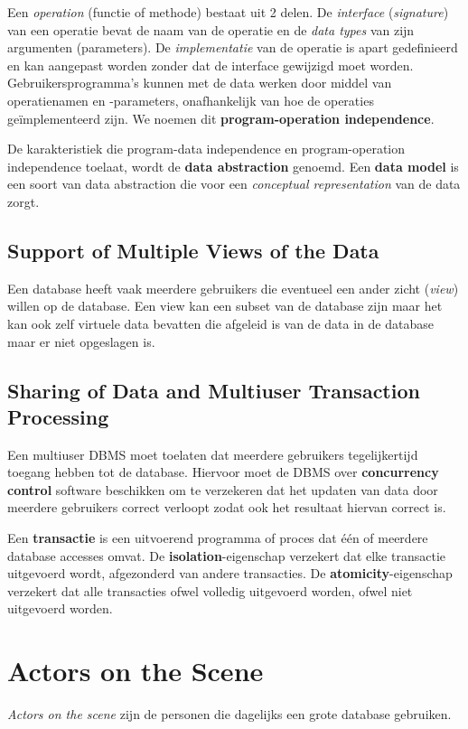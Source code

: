 Een \textit{operation} (functie of methode) bestaat uit 2 delen. De \textit{interface} (\textit{signature}) van een operatie bevat de naam van de operatie en de \textit{data types} van zijn argumenten (parameters). De \textit{implementatie} van de operatie is apart gedefinieerd en kan aangepast worden zonder dat de interface gewijzigd moet worden. Gebruikersprogramma's kunnen met de data werken door middel van operatienamen en -parameters, onafhankelijk van hoe de operaties ge\"implementeerd zijn. We noemen dit \textbf{program-operation independence}.

De karakteristiek die program-data independence en program-operation independence toelaat, wordt de \textbf{data abstraction} genoemd. Een \textbf{data model} is een soort van data abstraction die voor een \textit{conceptual representation} van de data zorgt.

\subsection{Support of Multiple Views of the Data}
Een database heeft vaak meerdere gebruikers die eventueel een ander zicht (\textit{view}) willen op de database. Een view kan een subset van de database zijn maar het kan ook zelf virtuele data bevatten die afgeleid is van de data in de database maar er niet opgeslagen is. 

\subsection{Sharing of Data and Multiuser Transaction Processing}
Een multiuser DBMS moet toelaten dat meerdere gebruikers tegelijkertijd toegang hebben tot de database. Hiervoor moet de DBMS over \textbf{concurrency control} software beschikken om te verzekeren dat het updaten van data door meerdere gebruikers correct verloopt zodat ook het resultaat hiervan correct is.

Een \textbf{transactie} is een uitvoerend programma of proces dat \'e\'en of meerdere database accesses omvat. De \textbf{isolation}-eigenschap verzekert dat elke transactie uitgevoerd wordt, afgezonderd van andere transacties. De \textbf{atomicity}-eigenschap verzekert dat alle transacties ofwel volledig uitgevoerd worden, ofwel niet uitgevoerd worden.


\newpage
\section{Actors on the Scene}
\textit{Actors on the scene} zijn de personen die dagelijks een grote database gebruiken.

